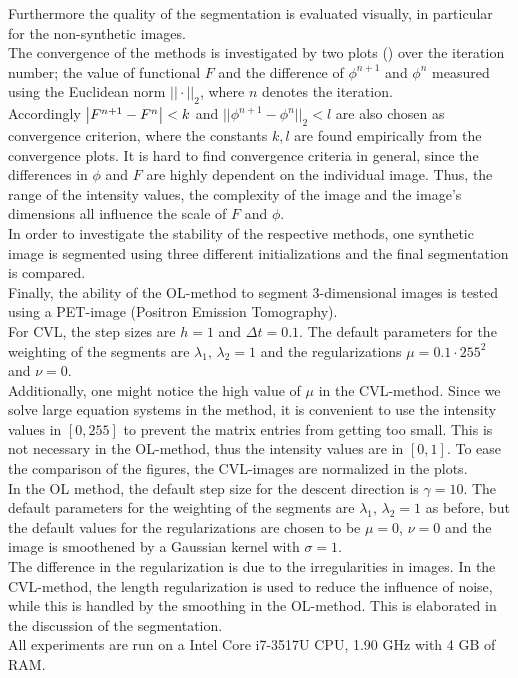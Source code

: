 Furthermore the quality of the segmentation is evaluated visually, in particular for the non-synthetic images.\\
The convergence of the methods is investigated by two plots () over the iteration number; the value of functional $F$ and the difference of $\phi^{n+1}$ and $\phi^n$ measured using the Euclidean norm $||\cdot||_2$, where $n$ denotes the iteration.\\
Accordingly $\left| {F^{n+1}-F^n} \right|<k$ and $||\phi^{n+1}-\phi^{n}||_2<l$ are also chosen as convergence criterion, where the constants $k,l$ are found empirically from the convergence plots. It is hard to find convergence criteria in general, since the differences in $\phi$ and $F$ are highly dependent on the individual image. Thus, the range of the intensity values, the complexity of the image and the image's dimensions all influence the scale of $F$ and $\phi$.\\
In order to investigate the stability of the respective methods, one synthetic image is segmented using three different initializations and the final segmentation is compared.\\
Finally, the ability of the OL-method to segment 3-dimensional images is tested using a PET-image (Positron Emission Tomography).\\

For CVL, the step sizes are $h=1$ and $\Delta t=0.1$. The default parameters for the weighting of the segments are $\lambda_1,\,\lambda_2 = 1$ and the regularizations $\mu = 0.1\cdot 255^2$ and $\nu = 0$.\\
Additionally, one might notice the high value of $\mu$ in the CVL-method. Since we solve large equation systems in the method, it is convenient to use the intensity values in $[0,255]$ to prevent the matrix entries from getting too small. This is not necessary in the OL-method, thus the intensity values are in $[0,1]$. To ease the comparison of the figures, the CVL-images are normalized in the plots.\\
In the OL method, the default step size for the descent direction is $\gamma = 10$. The default parameters for the weighting of the segments are $\lambda_1,\,\lambda_2 = 1$ as before, but the default values for the regularizations are chosen to be $\mu=0$, $\nu=0$ and the image is smoothened by a Gaussian kernel with $\sigma = 1$. \\
The difference in the regularization is due to the irregularities in images. In the CVL-method, the length regularization is used to reduce the influence of noise, while this is handled by the smoothing in the OL-method. This is elaborated in the discussion of the segmentation.\\
All experiments are run on a Intel Core i7-3517U CPU, 1.90 GHz with 4 GB of RAM.\\

